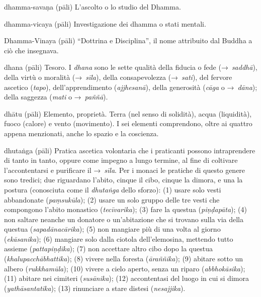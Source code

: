 \begin{glossarydescription}
\item[dhamma-savaṇa] (pāli) L'ascolto o lo studio del Dhamma.

\item[dhamma-vicaya] (pāli) Investigazione dei dhamma o stati mentali.

\item[Dhamma-Vinaya] (pāli) ``Dottrina e Disciplina'', il nome attribuito dal
  Buddha a ciò che insegnava.

\item[dhana] (pāli) Tesoro. I \emph{dhana} sono le sette qualità della fiducia o
  fede (→~\emph{saddhā}), della virtù o moralità (→~\emph{sīla}), della
  consapevolezza (→~\emph{sati}), del fervore ascetico (\emph{tapo}),
  dell'apprendimento (\emph{ajjhesanā}), della generosità (\emph{cāga} o
  →~\emph{dāna}); della saggezza (\emph{mati} o →~\emph{paññā}).

\item[dhātu] (pāli) Elemento, proprietà. Terra (nel senso di solidità), acqua
  (liquidità), fuoco (calore) e vento (movimento). I sei elementi comprendono,
  oltre ai quattro appena menzionati, anche lo spazio e la coscienza.

\item[dhutaṅga] (pāli)\label{glossary-dhutanga} Pratica ascetica volontaria che i praticanti possono
  intraprendere di tanto in tanto, oppure come impegno a lungo termine, al fine
  di coltivare l'accontentarsi e purificare il →~\emph{sīla}. Per i monaci le
  pratiche di questo genere sono tredici; due riguardano l'abito, cinque il
  cibo, cinque la dimora, e una la postura (conosciuta come il \emph{dhutaṅga}
  dello sforzo): (1) usare solo vesti abbandonate (\emph{paṃsukūla}); (2) usare
  un solo gruppo delle tre vesti che compongono l'abito monastico
  (\emph{tecīvarika}); (3) fare la questua (\emph{piṇḍapāta}); (4) non saltare
  neanche un donatore o un'abitazione che si trovano sulla via della questua
  (\emph{sapadānacārika}); (5) non mangiare più di una volta al giorno
  (\emph{ekāsanika}); (6) mangiare solo dalla ciotola dell'elemosina, mettendo
  tutto assieme (\emph{pattapiṇḍika}); (7) non accettare altro cibo dopo la
  questua (\emph{khalupacchābhattika}); (8) vivere nella foresta
  (\emph{āraññika}); (9) abitare sotto un albero (\emph{rukkhamūla}); (10)
  vivere a cielo aperto, senza un riparo (\emph{abbhokāsika}); (11) abitare nei
  cimiteri (\emph{susānika}); (12) accontentasi del luogo in cui si dimora
  (\emph{yathāsantatika}); (13) rinunciare a stare distesi (\emph{nesajjika}).


\end{glossarydescription}
